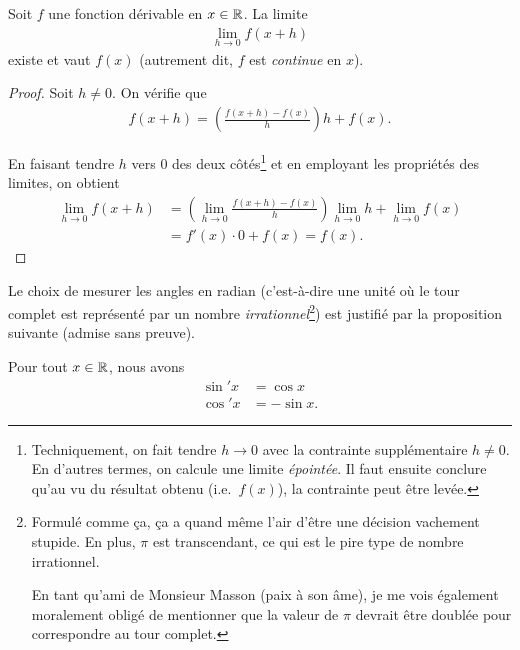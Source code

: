 \documentclass[main.tex]{subfiles}
\begin{document}
\begin{proposition}

    Soit $f$ une fonction dérivable en $x \in \mathbb{R}$.
    La limite
    \begin{align}
        \lim_{h \to 0} f(x + h)
    \end{align}
    existe et vaut $f(x)$
    (autrement dit, $f$ est \emph{continue} en $x$).
\end{proposition}
\begin{proof}
    Soit $h \neq 0$.
    On vérifie que
    \begin{align}
        f(x + h) = \left(\frac {f(x + h) - f(x)} h\right) h + f(x).
    \end{align}

    En faisant tendre $h$ vers $0$ des deux côtés\footnote{%
        Techniquement, on fait tendre $h \to 0$ avec la contrainte supplémentaire $h \neq 0$.
        En d'autres termes, on calcule une limite \emph{épointée}.
        Il faut ensuite conclure qu'au vu du résultat obtenu (i.e.\ $f(x)$),
        la contrainte peut être levée.
    }
    et en employant les propriétés des limites,
    on obtient
    \begin{align}
        \lim_{h \to 0} f(x + h)
        &= \left(\lim_{h \to 0} \frac {f(x + h) - f(x)} h\right) \lim_{h \to 0} h + \lim_{h \to 0} f(x)\\
        &= f'(x) \cdot 0 + f(x) = f(x).
    \end{align}
\end{proof}

Le choix de mesurer les angles en radian
(c'est-à-dire une unité où le tour complet est représenté par un nombre \emph{irrationnel}\footnote{%
    Formulé comme ça, ça a quand même l'air d'être une décision vachement stupide.
    En plus, $\pi$ est transcendant, ce qui est le pire type de nombre irrationnel.

    En tant qu'ami de Monsieur Masson (paix à son âme),
    je me vois également moralement obligé de mentionner
    que la valeur de $\pi$ devrait être doublée pour correspondre au tour complet.
})
est justifié par la proposition suivante (admise sans preuve).

\begin{proposition}

    Pour tout $x \in \mathbb{R}$,
    nous avons
    \begin{align}
        \sin' x &= \cos x\\
        \cos' x &= -\sin x.
    \end{align}
\end{proposition}
\end{document}

